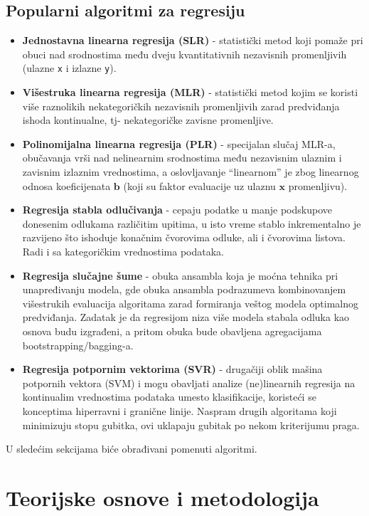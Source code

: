 \documentclass[fontsize=12bp, paper=a4]{scrarticle}
\begin{document}
\subsection{Popularni algoritmi za regresiju}
\justifying
\begin{itemize}
    \item \textbf{Jednostavna linearna regresija (SLR)} - statistički metod koji pomaže pri obuci nad srodnostima među dveju kvantitativnih nezavisnih promenljivih (ulazne \texttt{x} i izlazne \texttt{y}).
    \item \textbf{Višestruka linearna regresija (MLR)} - statistički metod kojim se koristi više raznolikih nekategoričkih nezavisnih promenljivih zarad predviđanja ishoda kontinualne, tj- nekategoričke zavisne promenljive.
    \item \textbf{Polinomijalna linearna regresija (PLR)} - specijalan slučaj MLR-a, obučavanja vrši nad nelinearnim srodnostima među nezavisnim ulaznim i zavisnim izlaznim vrednostima, a oslovljavanje ``linearnom'' je zbog linearnog odnosa koeficijenata $\textbf{b}$ (koji su faktor evaluacije uz ulaznu $\textbf{x}$ promenljivu).
    \item \textbf{Regresija stabla odlučivanja} - cepaju podatke u manje podskupove donesenim odlukama različitim upitima, u isto vreme stablo inkrementalno je razvijeno što ishoduje konačnim čvorovima odluke, ali i čvorovima listova. Radi i sa kategoričkim vrednostima podataka.
    \item \textbf{Regresija slučajne šume} - obuka ansambla koja je moćna tehnika pri unapređivanju modela, gde obuka ansambla podrazumeva kombinovanjem višestrukih evaluacija algoritama zarad formiranja veštog modela optimalnog predviđanja. Zadatak je da regresijom niza više modela stabala odluka kao osnova budu izgrađeni, a pritom obuka bude obavljena agregacijama bootstrapping/bagging-a.
    \item \textbf{Regresija potpornim vektorima (SVR)} - drugačiji oblik mašina potpornih vektora (SVM) i mogu obavljati analize (ne)linearnih regresija na kontinualim vrednostima podataka umesto klasifikacije, koristeći se konceptima hiperravni i granične linije. Naspram drugih algoritama koji minimizuju stopu gubitka, ovi uklapaju gubitak po nekom kriterijumu praga.\cite{algs}
\end{itemize}
U sledećim sekcijama biće obrađivani pomenuti algoritmi.
\newpage
\section{Teorijske osnove i metodologija}
\end{document}

